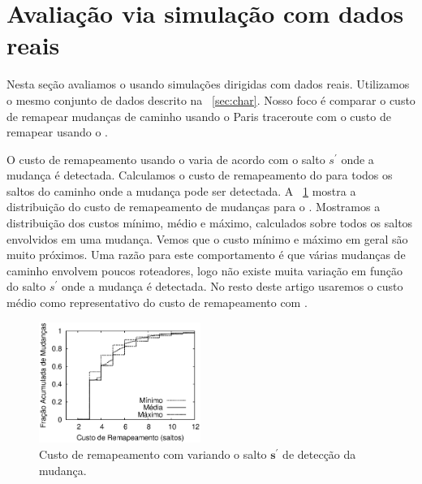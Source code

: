 \section{Avaliação via simulação com dados reais}
\label{sec:sim}

Nesta seção avaliamos o \rmprt{} usando simulações dirigidas com dados
reais.  Utilizamos o mesmo conjunto de dados descrito na
\secstr~\ref{sec:char}.  Nosso foco é comparar o custo de remapear
mudanças de caminho usando o Paris traceroute com o custo de remapear
usando o \rmprt.

O custo de remapeamento usando o \rmprt{} varia de acordo com o salto
$s^\prime$ onde a mudança é detectada.  Calculamos o custo de
remapeamento do \rmprt{} para todos os saltos do caminho onde a mudança
pode ser detectada.  A \figstr~\ref{fig:sim.rmprt.start} mostra a
distribuição do custo de remapeamento de mudanças para o \rmprt{}.
Mostramos a distribuição dos custos mínimo, médio e máximo, calculados
sobre todos os saltos envolvidos em uma mudança.  Vemos que o custo
mínimo e máximo em geral são muito próximos.  Uma razão para este
comportamento é que várias mudanças de caminho envolvem poucos
roteadores, logo não existe muita variação em função do salto $s^\prime$
onde a mudança é detectada.  No resto deste artigo usaremos o custo
médio como representativo do custo de remapeamento com \rmprt{}.

\begin{figure}
\begin{center}
\includegraphics[width=0.47\textwidth]{figs/rmprtcost.eps}
\caption{Custo de remapeamento com \rmprt{} variando o salto
$\boldsymbol{s^\prime}$ de detecção da mudança.}
\label{fig:sim.rmprt.start}
\end{center}
\end{figure}


